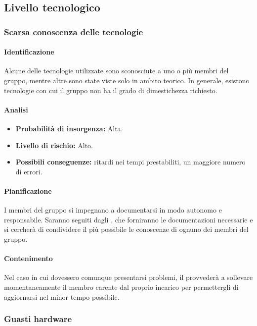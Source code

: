 \subsection{Livello tecnologico}
\subsubsection{Scarsa conoscenza delle tecnologie}

\paragraph {Identificazione}
Alcune delle tecnologie utilizzate sono sconosciute a uno o più membri del gruppo, mentre altre sono state viste solo in ambito teorico. In generale, esistono tecnologie con cui il gruppo non ha il grado di dimestichezza richiesto.

\paragraph {Analisi}
\begin{itemize}
	\item \textbf{Probabilità di insorgenza:} Alta.
	\item \textbf{Livello di rischio:} Alto.
	\item \textbf{Possibili conseguenze:} ritardi nei tempi prestabiliti, un maggiore numero di errori.
\end{itemize}

\paragraph {Pianificazione}
I membri del gruppo si impegnano a documentarsi in modo autonomo e responsabile. Saranno seguiti dagli \adms{}, che forniranno le documentazioni necessarie e si cercherà di condividere il più possibile le conoscenze di ognuno dei membri del gruppo.

\paragraph {Contenimento} Nel caso in cui dovessero comunque presentarsi problemi, il \RdP{} provvederà a sollevare momentaneamente il membro carente dal proprio incarico per permettergli di aggiornarsi nel minor tempo possibile. 

\subsubsection{Guasti hardware}
